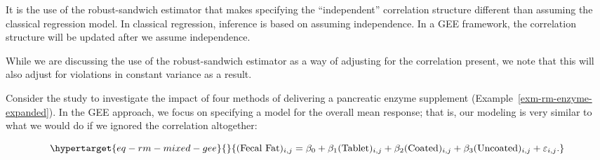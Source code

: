 \documentclass[
  letterpaper,
  DIV=11,
  numbers=noendperiod]{scrreprt}
\theoremstyle{definition}
\theoremstyle{definition}
\theoremstyle{remark}
\begin{document}
\begin{tcolorbox}[enhanced jigsaw, bottomrule=.15mm, titlerule=0mm, bottomtitle=1mm, colback=white, coltitle=black, rightrule=.15mm, leftrule=.75mm, toprule=.15mm, toptitle=1mm, left=2mm, opacityback=0, colframe=quarto-callout-note-color-frame, breakable, title=\textcolor{quarto-callout-note-color}{\faInfo}\hspace{0.5em}{Note}, arc=.35mm, colbacktitle=quarto-callout-note-color!10!white, opacitybacktitle=0.6]

It is the use of the robust-sandwich estimator that makes specifying the
``independent'' correlation structure different than assuming the
classical regression model. In classical regression, inference is based
on assuming independence. In a GEE framework, the correlation structure
will be updated after we assume independence.

\end{tcolorbox}

\begin{tcolorbox}[enhanced jigsaw, bottomrule=.15mm, titlerule=0mm, bottomtitle=1mm, colback=white, coltitle=black, rightrule=.15mm, leftrule=.75mm, toprule=.15mm, toptitle=1mm, left=2mm, opacityback=0, colframe=quarto-callout-note-color-frame, breakable, title=\textcolor{quarto-callout-note-color}{\faInfo}\hspace{0.5em}{Note}, arc=.35mm, colbacktitle=quarto-callout-note-color!10!white, opacitybacktitle=0.6]

While we are discussing the use of the robust-sandwich estimator as a
way of adjusting for the correlation present, we note that this will
also adjust for violations in constant variance as a result.

\end{tcolorbox}

Consider the study to investigate the impact of four methods of
delivering a pancreatic enzyme supplement
(Example~\ref{exm-rm-enzyme-expanded}). In the GEE approach, we focus on
specifying a model for the overall mean response; that is, our modeling
is very similar to what we would do if we ignored the correlation
altogether:

\begin{equation}\protect\hypertarget{eq-rm-mixed-gee}{}{(\text{Fecal Fat})_{i,j} = \beta_0 + \beta_1 (\text{Tablet})_{i,j} + \beta_2 (\text{Coated})_{i,j} + \beta_3 (\text{Uncoated})_{i,j} + \varepsilon_{i,j}.}\label{eq-rm-mixed-gee}\end{equation}
\end{document}
